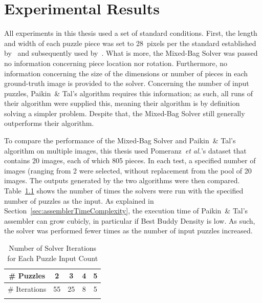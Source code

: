 \chapter{Experimental Results}\label{chap:experimentalResults}

All experiments in this thesis used a set of standard conditions.  First, the length and width of each puzzle piece was set to 28~pixels per the standard established by~\cite{cho2010} and subsequently used by~\cite{pomeranz2011, gallagher2012, sholomon2013, paikin2015}. What is more, the Mixed-Bag Solver was passed no information concerning piece location nor rotation.  Furthermore, no information concerning the size of the dimensions or number of pieces in each ground-truth image is provided to the solver.  Concerning the number of input puzzles, Paikin~\& Tal's algorithm requires this information; as such, all runs of their algorithm were supplied this, meaning their algorithm is by definition solving a simpler problem.  Despite that, the Mixed-Bag Solver still generally outperforms their algorithm.

To compare the performance of the Mixed-Bag Solver and Paikin~\& Tal's algorithm on multiple images, this thesis used Pomeranz~\textit{et al.}'s dataset that contains 20 images, each of which 805 pieces.  In each test, a specified number of images (ranging from 2 were selected, without replacement from the pool of 20 images.  The outputs generated by the two algorithms were then compared.  Table~\ref{tab:numberSolverIterations} shows the number of times the solvers were run with the specified number of puzzles as the input. As explained in Section~\ref{sec:assemblerTimeComplexity}, the execution time of Paikin~\& Tal's assembler can grow cubicly, in particular if Best Buddy Density is low.  As such, the solver was performed fewer times as the number of input puzzles increased.

\begin{table}[tb]
\begin{center}
\begin{tabular}{ |c||c|c|c|c| } 
 \Xhline{1pt}
 \# Puzzles    &  2 &  3 & 4 & 5 \\ 
\hline \hline
 \# Iterations & 55 & 25 & 8 & 5 \\ 
 \Xhline{1pt}
\end{tabular}
\end{center}
\caption{Number of Solver Iterations for Each Puzzle Input Count}\label{tab:numberSolverIterations}
\end{table}

